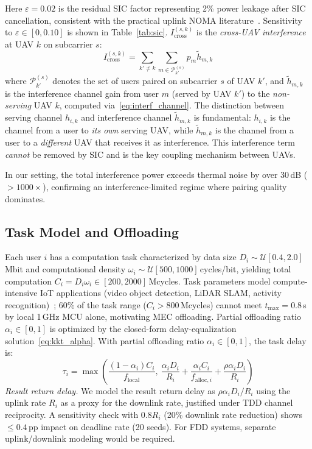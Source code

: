 \documentclass[journal]{IEEEtran}
\begin{document}
Here $\varepsilon = 0.02$ is the residual SIC factor representing 2\% power leakage after SIC cancellation, consistent with the practical uplink NOMA literature~\cite{ding2019impact,saito2013non}.
Sensitivity to $\varepsilon \in [0, 0.10]$ is shown in Table~\ref{tab:sic}.
$I_{\text{cross}}^{(s,k)}$ is the \emph{cross-UAV interference} at UAV $k$ on subcarrier $s$:
\begin{equation}
    I_{\text{cross}}^{(s,k)} = \sum_{k' \neq k} \sum_{m \in \mathcal{P}_{k'}^{(s)}} p_m \tilde{h}_{m,k}
    \label{eq:cross_interf}
\end{equation}
where $\mathcal{P}_{k'}^{(s)}$ denotes the set of users paired on subcarrier $s$ of UAV $k'$, and $\tilde{h}_{m,k}$ is the interference channel gain from user $m$ (served by UAV $k'$) to the \emph{non-serving} UAV $k$, computed via~\eqref{eq:interf_channel}.
The distinction between serving channel $h_{i,k}$ and interference channel $\tilde{h}_{m,k}$ is fundamental: $h_{i,k}$ is the channel from a user to \emph{its own} serving UAV, while $\tilde{h}_{m,k}$ is the channel from a user to a \emph{different} UAV that receives it as interference.
This interference term \emph{cannot} be removed by SIC and is the key coupling mechanism between UAVs.

In our setting, the total interference power exceeds thermal noise by over 30\,dB ($>\!1000\times$), confirming an interference-limited regime where pairing quality dominates.

\subsection{Task Model and Offloading}

Each user $i$ has a computation task characterized by data size $D_i \sim \mathcal{U}[0.4, 2.0]$\,Mbit and computational density $\omega_i \sim \mathcal{U}[500, 1000]$\,cycles/bit, yielding total computation $C_i = D_i \omega_i \in [200, 2000]$\,Mcycles.
Task parameters model compute-intensive IoT applications (video object detection, LiDAR SLAM, activity recognition)~\cite{mao2017survey,ding2019impact}; 60\% of the task range ($C_i > 800$\,Mcycles) cannot meet $t_{\max}=0.8$\,s by local 1\,GHz MCU alone, motivating MEC offloading.
Partial offloading ratio $\alpha_i \in [0,1]$ is optimized by the closed-form delay-equalization solution~\eqref{eq:kkt_alpha}.
With partial offloading ratio $\alpha_i \in [0,1]$, the task delay is:
\begin{equation}
    \tau_i = \max\left(\frac{(1\!-\!\alpha_i) C_i}{f_{\text{local}}},\ \frac{\alpha_i D_i}{R_i} + \frac{\alpha_i C_i}{f_{\text{alloc},i}} + \frac{\rho \alpha_i D_i}{R_i}\right)
    \label{eq:delay}
\end{equation}
\textit{Result return delay.}
We model the result return delay as $\rho \alpha_i D_i / R_i$ using the uplink rate $R_i$ as a proxy for the downlink rate, justified under TDD channel reciprocity.
A sensitivity check with $0.8 R_i$ (20\% downlink rate reduction) shows $\leq 0.4$\,pp impact on deadline rate (20 seeds).
For FDD systems, separate uplink/downlink modeling would be required.
\end{document}
